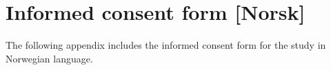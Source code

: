 \chapter{Informed consent form [Norsk]}
\label{app:consentformNorsk}
The following appendix includes the informed consent form for the study in Norwegian language.


